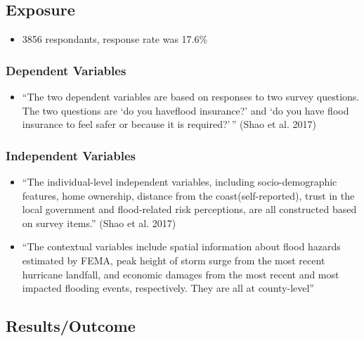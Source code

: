 \documentclass[
]{article}
\providecommand{\tightlist}{%
  \setlength{\itemsep}{0pt}\setlength{\parskip}{0pt}}
\begin{document}
\hypertarget{exposure-25}{%
\subsection{Exposure}\label{exposure-25}}

\begin{itemize}
\tightlist
\item
  3856 respondants, response rate was 17.6\%
\end{itemize}

\hypertarget{dependent-variables}{%
\subsubsection{Dependent Variables}\label{dependent-variables}}

\begin{itemize}
\tightlist
\item
  ``The two dependent variables are based on responses to two survey
  questions. The two questions are `do you haveflood insurance?' and `do
  you have flood insurance to feel safer or because it is required?'\,''
  (Shao et al. 2017)
\end{itemize}

\hypertarget{independent-variables}{%
\subsubsection{Independent Variables}\label{independent-variables}}

\begin{itemize}
\tightlist
\item
  ``The individual-level independent variables, including
  socio-demographic features, home ownership, distance from the
  coast(self-reported), trust in the local government and flood-related
  risk perceptions, are all constructed based on survey items.'' (Shao
  et al. 2017)
\item
  ``The contextual variables include spatial information about flood
  hazards estimated by FEMA, peak height of storm surge from the most
  recent hurricane landfall, and economic damages from the most recent
  and most impacted flooding events, respectively. They are all at
  county-level''
\end{itemize}

\hypertarget{resultsoutcome-7}{%
\subsection{Results/Outcome}\label{resultsoutcome-7}}
\end{document}
